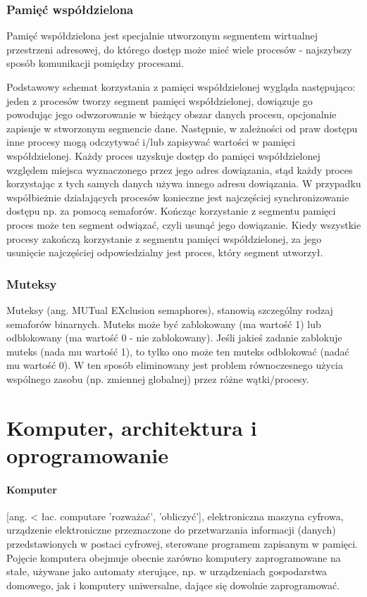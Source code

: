 \documentclass[a4paper,twoside]{report}
\begin{document}
\subsubsection{Pamięć współdzielona}
Pamięć współdzielona jest specjalnie utworzonym segmentem wirtualnej przestrzeni adresowej, do którego dostęp może mieć wiele procesów - najszybszy sposób komunikacji pomiędzy procesami. 

Podstawowy schemat korzystania z pamięci współdzielonej wygląda następująco: jeden z procesów tworzy segment pamięci współdzielonej, dowiązuje go powodując jego odwzorowanie w bieżący obszar danych procesu, opcjonalnie zapisuje w stworzonym segmencie dane. Następnie, w zależności od praw dostępu inne procesy mogą odczytywać i/lub zapisywać wartości w pamięci współdzielonej. Każdy proces uzyskuje dostęp do pamięci współdzielonej względem miejsca wyznaczonego przez jego adres dowiązania, stąd każdy proces korzystając z tych samych danych używa innego adresu dowiązania. W przypadku współbieżnie działających procesów konieczne jest najczęściej synchronizowanie dostępu np. za pomocą semaforów. Kończąc korzystanie z segmentu pamięci proces może ten segment odwiązać, czyli usunąć jego dowiązanie. Kiedy wszystkie procesy zakończą korzystanie z segmentu pamięci współdzielonej, za jego usunięcie najczęściej odpowiedzialny jest proces, który segment utworzył.

\subsubsection{Muteksy}
Muteksy (ang. MUTual EXclusion semaphores), stanowią szczególny rodzaj semaforów binarnych. Muteks może być zablokowany (ma wartość 1) lub odblokowany (ma wartość 0 - nie zablokowany). Jeśli jakieś zadanie zablokuje muteks (nada mu wartość 1), to tylko ono może ten muteks odblokować (nadać mu wartość 0). W ten sposób eliminowany jest problem równoczesnego użycia wspólnego zasobu (np. zmiennej globalnej) przez różne wątki/procesy.

\section{Komputer, architektura i oprogramowanie}
\paragraph{Komputer} [ang. < łac. computare 'rozważać', 'obliczyć'], elektroniczna maszyna cyfrowa, urządzenie elektroniczne przeznaczone do przetwarzania informacji (danych) przedstawionych w postaci cyfrowej, sterowane programem zapisanym w pamięci.
Pojęcie komputera obejmuje obecnie zarówno komputery zaprogramowane na stałe, używane jako automaty sterujące, np. w urządzeniach gospodarstwa domowego, jak i komputery uniwersalne, dające się dowolnie zaprogramować.
\end{document}
